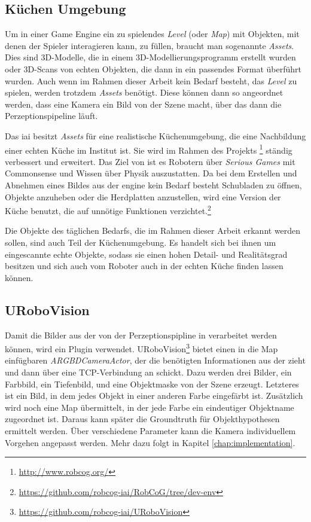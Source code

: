 \subsection{Küchen Umgebung}
\label{subsec:kitchenenvironment}
Um in einer Game Engine ein zu spielendes \textit{Level} (oder \textit{Map}) mit Objekten, mit denen der Spieler interagieren kann, zu füllen, braucht man sogenannte \textit{Assets}. Dies sind 3D-Modelle, die in einem 3D-Modellierungsprogramm erstellt wurden oder 3D-Scans von echten Objekten, die dann in ein passendes Format überführt wurden. Auch wenn im Rahmen dieser Arbeit kein Bedarf besteht, das \textit{Level} zu spielen, werden trotzdem \textit{Assets} benötigt. Diese können dann so angeordnet werden, dass eine Kamera ein Bild von der Szene macht, über das dann die Perzeptionspipeline läuft. \par
Das \gls{iai} besitzt \textit{Assets} für eine realistische Küchenumgebung, die eine Nachbildung einer echten Küche im Institut ist. Sie wird im Rahmen des Projekts \robcog\footnote{\url{http://www.robcog.org/}} ständig verbessert und erweitert. Das Ziel von \robcog ist es Robotern über \textit{Serious Games} mit Commonsense und Wissen über Physik auszustatten. Da bei dem Erstellen und Abnehmen eines Bildes aus der \acrshort{engine} kein Bedarf besteht Schubladen zu öffnen, Objekte anzuheben oder die Herdplatten anzustellen, wird eine Version der Küche benutzt, die auf unnötige Funktionen verzichtet.\footnote{\url{https://github.com/robcog-iai/RobCoG/tree/dev-env}} \par
Die Objekte des täglichen Bedarfs, die im Rahmen dieser Arbeit erkannt werden sollen, sind auch Teil der Küchenumgebung. Es handelt sich bei ihnen um eingescannte echte Objekte, sodass sie einen hohen Detail- und Realitätsgrad besitzen und sich auch vom Roboter auch in der echten Küche finden lassen können.
 
\subsection{URoboVision}
\label{subsec:urobovision}
Damit die Bilder aus der \unreal von der Perzeptionspipline in \robosherlock verarbeitet werden können, wird ein \unreal Plugin verwendet. URoboVision\footnote{\url{https://github.com/robcog-iai/URoboVision}} bietet einen in die Map einfügbaren \textit{ARGBDCameraActor}, der die benötigten Informationen aus der \unreal zieht und dann über eine TCP-Verbindung an \robosherlock schickt.  Dazu werden drei Bilder, ein Farbbild, ein Tiefenbild, und eine Objektmaske von der Szene erzeugt. Letzteres ist ein Bild, in dem jedes Objekt in einer anderen Farbe eingefärbt ist. Zusätzlich wird noch eine Map übermittelt, in der jede Farbe ein eindeutiger Objektname zugeordnet ist. Daraus kann später die Groundtruth für Objekthypothesen  ermittelt werden. Über verschiedene Parameter kann die Kamera individuellem Vorgehen angepasst werden. Mehr dazu folgt in Kapitel \ref{chap:implementation}. \par 

